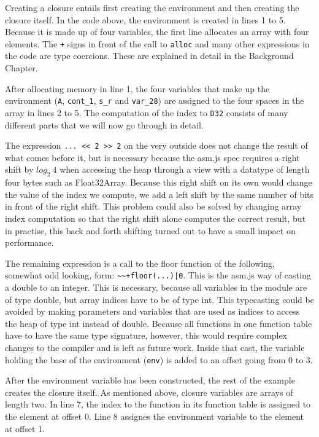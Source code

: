 \documentclass[11pt]{report}
\begin{document}
Creating a closure entails first creating the environment and then creating the closure itself. In the code above, the environment is created in lines 1 to 5. Because it is made up of four variables, the first line allocates an array with four elements. The \texttt{+} signs in front of the call to \texttt{alloc} and many other expressions in the code are type coercions. These are explained in detail in the Background Chapter.

After allocating memory in line 1, the four variables that make up the environment (\texttt{A}, \texttt{cont_1}, \texttt{s_r} and \texttt{var_28}) are assigned to the four spaces in the array in lines 2 to 5. The computation of the index to \texttt{D32} consists of many different parts that we will now go through in detail.

The expression \texttt{... {<}< 2 {>}> 2} on the very outside does not change the result of what comes before it, but is necessary because the asm.js spec requires a right shift by $log_2~4$ when accessing the heap through a view with a datatype of length four bytes such as Float32Array. Because this right shift on its own would change the value of the index we compute, we add a left shift by the same number of bits in front of the right shift. This problem could also be solved by changing array index computation so that the right shift alone computes the correct result, but in practise, this back and forth shifting turned out to have a small impact on performance.

The remaining expression is a call to the floor function of the following, somewhat odd looking, form: \texttt{\textasciitilde\textasciitilde+floor(...)|0}. This is the asm.js way of casting a double to an integer. This is necessary, because all variables in the module are of type double, but array indices have to be of type int. This typecasting could be avoided by making parameters and variables that are used as indices to access the heap of type int instead of double. Because all functions in one function table have to have the same type signature, however, this would require complex changes to the compiler and is left as future work. Inside that cast, the variable holding the base of the environment (\texttt{env}) is added to an offset going from $0$ to $3$. 

After the environment variable has been constructed, the rest of the example creates the closure itself. As mentioned above, closure variables are arrays of length two. In line 7, the index to the function in its function table is assigned to the element at offset 0. Line 8 assignes the environment variable to the element at offset 1.
\end{document}
